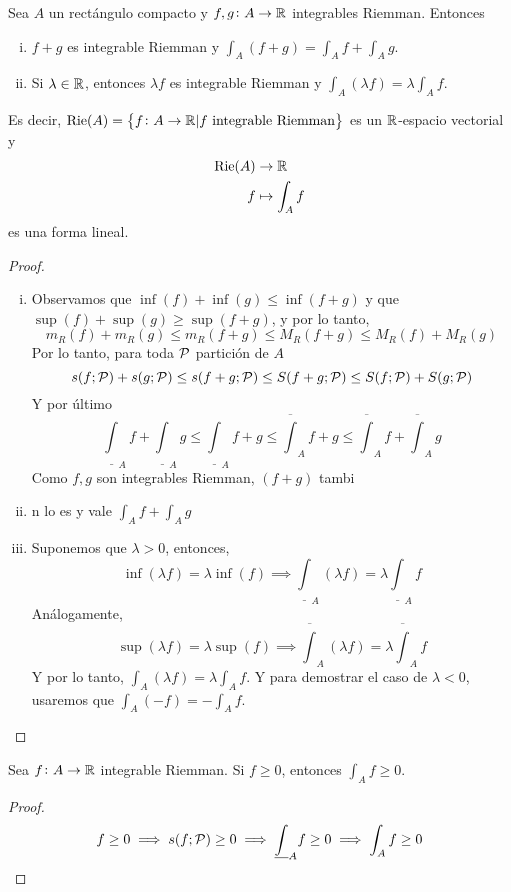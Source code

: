 \begin{prop}[Linealidad]\label{prop:lin_int}
	Sea $A$ un rectángulo compacto y $f,g \colon A \to \mathbb{R}$ integrables Riemman.
	Entonces
	\begin{enumerate}[i)]
		\item $f+g$ es integrable Riemman y $\int_A (f+g) = \int_A f+\int_A g$.
		\item Si $\lambda \in \mathbb{R}$, entonces $\lambda f$ es integrable
			Riemman y $\int_A (\lambda f) = \lambda \int_A f$.
	\end{enumerate}

	Es decir, $\text{Rie}(A) = \left\{f \colon A \to \mathbb{R} \vert f \text{ integrable
	Riemman}\right\}$ es un $\mathbb{R}$-espacio vectorial y 
	\[
		\begin{aligned}
			\text{Rie}(A) &\to \mathbb{R} \\ f &\mapsto \int_A f
		\end{aligned}
	\]
	es una forma lineal.
\end{prop}
\begin{proof}
	\begin{enumerate}[i)]
		\item Observamos que $\inf(f) + \inf(g) \leq \inf(f+g)$ y que
			$\sup(f)+\sup(g) \geq \sup(f+g)$, y por lo tanto,
			\[
				m_R(f) + m_R(g) \leq m_R(f+g) \leq M_R(f+g) \leq
				M_R(f) + M_R(g)
			\]
			Por lo tanto, para toda $\mathcal{P}$ partición de $A$
			\[
				s(f;\mathcal{P}) + s(g;\mathcal{P}) \leq s(f+g;\mathcal{P}) \leq S(f+g;\mathcal{P})
				\leq S(f;\mathcal{P}) + S(g;\mathcal{P})
			\]
			Y por último
			\[
				\underline{\int}_A f + \underline{\int}_A g \leq
				\underline{\int}_A f+g \leq \overline{\int}_A f+g \leq
				\overline{\int}_A f + \overline{\int}_A g
			\]
			Como $f,g$ son integrables Riemman, $(f+g)$ tambi\item n lo es
			y vale $\int_A f + \int_A g$
		\item Suponemos que $\lambda > 0$, entonces,
			\[
				\inf (\lambda f) = \lambda \inf (f) \implies
				\underline{\int}_A (\lambda f) = \lambda
				\underline{\int}_A f
			\]
			Análogamente,
			\[
				\sup(\lambda f) = \lambda \sup(f) \implies
				\overline{\int}_A (\lambda f) = \lambda
				\overline{\int}_A f
			\]
			Y por lo tanto, $\int_A (\lambda f) = \lambda \int_A f$.
			Y para demostrar el caso de $\lambda < 0$, usaremos que
			$\int_A (-f) = - \int_A f$.
	\end{enumerate}
\end{proof}

\begin{prop}[Positividad]\label{prop:pos_int}
	Sea $f \colon A \to \mathbb{R}$ integrable Riemman. Si $f \geq 0$, entonces
	$\int_A f \geq 0$.
\end{prop}
\begin{proof}
	\[
		f \geq 0 \implies s(f;\mathcal{P}) \geq 0 \implies \underline{\int}_A f \geq 0
		\implies \int_A f \geq 0
	\]
\end{proof}

